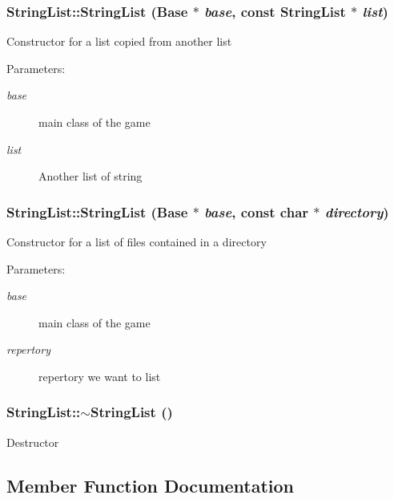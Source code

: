 \subsubsection{\setlength{\rightskip}{0pt plus 5cm}StringList::StringList (Base $\ast$ {\em base}, const {\bf StringList} $\ast$ {\em list})}\label{classStringList_126961fc65cb9023e637b71a03c12a5b}


Constructor for a list copied from another list \begin{Desc}
\item[Parameters:]
\begin{description}
\item[{\em base}]main class of the game \item[{\em list}]Another list of string \end{description}
\end{Desc}
\subsubsection{\setlength{\rightskip}{0pt plus 5cm}StringList::StringList (Base $\ast$ {\em base}, const char $\ast$ {\em directory})}\label{classStringList_d41afc751a07197d64f74bb9e4e7a9f0}


Constructor for a list of files contained in a directory \begin{Desc}
\item[Parameters:]
\begin{description}
\item[{\em base}]main class of the game \item[{\em repertory}]repertory we want to list \end{description}
\end{Desc}
\subsubsection{\setlength{\rightskip}{0pt plus 5cm}StringList::$\sim$StringList ()}\label{classStringList_578ccde3ffad1066142964a8f63b609e}


Destructor 

\subsection{Member Function Documentation}
